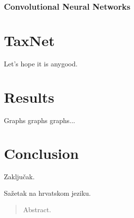 \documentclass[times, utf8, diplomski]{fer}
\begin{document}
\subsection{Convolutional Neural Networks}


\chapter{TaxNet}
Let's hope it is anygood.

\chapter{Results}
Graphs graphs graphs...

\chapter{Conclusion}
Zaključak.





\begin{sazetak}
Sažetak na hrvatskom jeziku.

\end{sazetak}

\begin{abstract}
Abstract.

\end{abstract}
\end{document}
